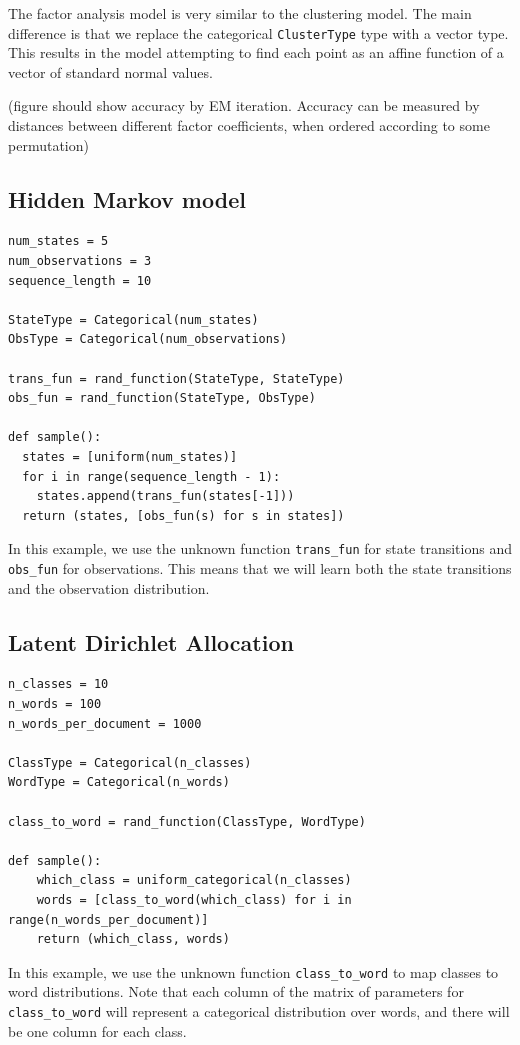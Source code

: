 \documentclass[proceed]{article}
\begin{document}
The factor analysis model is very similar to the clustering model.  The main difference is that we replace the categorical \texttt{ClusterType} type with a vector type.  This results in the model attempting to find each point as an affine function of a vector of standard normal values.

(figure should show accuracy by EM iteration.  Accuracy can be measured by distances between different factor coefficients, when ordered according to some permutation)
  \subsection{Hidden Markov model}
\begin{verbatim}
num_states = 5
num_observations = 3
sequence_length = 10

StateType = Categorical(num_states)
ObsType = Categorical(num_observations)

trans_fun = rand_function(StateType, StateType)
obs_fun = rand_function(StateType, ObsType)

def sample():
  states = [uniform(num_states)]
  for i in range(sequence_length - 1):
    states.append(trans_fun(states[-1]))
  return (states, [obs_fun(s) for s in states])
\end{verbatim}

In this example, we use the unknown function \texttt{trans\_fun} for state transitions and \texttt{obs\_fun} for observations.  This means that we will learn both the state transitions and the observation distribution.


\subsection{Latent Dirichlet Allocation}

\begin{verbatim}
n_classes = 10
n_words = 100
n_words_per_document = 1000

ClassType = Categorical(n_classes)
WordType = Categorical(n_words)

class_to_word = rand_function(ClassType, WordType)

def sample():
    which_class = uniform_categorical(n_classes)
    words = [class_to_word(which_class) for i in range(n_words_per_document)]
    return (which_class, words)
\end{verbatim}

In this example, we use the unknown function \texttt{class\_to\_word} to map classes to word distributions.  Note that each column of the matrix of parameters for \texttt{class\_to\_word} will represent a categorical distribution over words, and there will be one column for each class.
\end{document}
